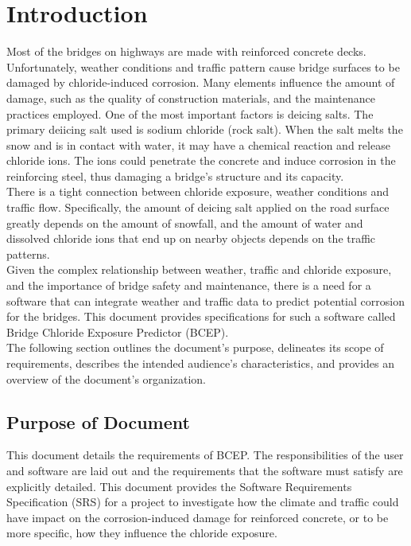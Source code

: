 \documentclass[12pt]{article}
\begin{document}
\break


\section{Introduction}
Most of the bridges on highways are made with reinforced concrete decks. Unfortunately, weather conditions and traffic pattern cause bridge surfaces to be damaged by chloride-induced corrosion. Many elements influence the amount of damage, such as the quality of construction materials, and the maintenance practices employed. One of the most important factors is deicing salts. The primary deiicing salt used is sodium chloride (rock salt). When the salt melts the snow and is in contact with water, it may have a chemical reaction and release chloride ions. The ions could penetrate the concrete and induce corrosion in the reinforcing steel, thus damaging a bridge's structure and its capacity. \\
There is a tight connection between chloride exposure, weather conditions and traffic flow. Specifically, the amount of deicing salt applied on the road surface greatly depends on the amount of snowfall, and the amount of water and dissolved chloride ions that end up on nearby objects depends on the traffic patterns.\\
Given the complex relationship between weather, traffic and chloride exposure, and the importance of bridge safety and maintenance, there is a need for a software that can integrate weather and traffic data to predict potential corrosion for the bridges. This document provides specifications for such a software called Bridge Chloride Exposure Predictor (BCEP). \\
The following section outlines the document's purpose, delineates its scope of requirements, describes the intended audience's characteristics, and provides an overview of the document's organization.

\subsection{Purpose of Document}
This document details the requirements of BCEP. The
responsibilities of the user and software are laid out and the requirements that the software must satisfy are explicitly detailed. This document provides the Software Requirements Specification (SRS) for a project to investigate how the climate and traffic could have impact on the corrosion-induced damage for reinforced concrete, or to be more specific, how they influence the chloride exposure. 
\end{document}
